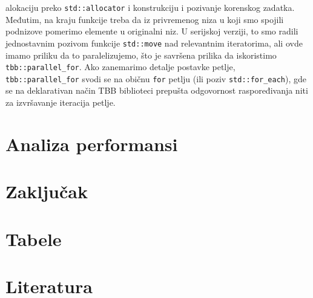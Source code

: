 \documentclass[a4paper,11pt]{article}
\begin{document}
    alokaciju preko \verb|std::allocator| i konstrukciju i pozivanje korenskog zadatka. Međutim,
    na kraju funkcije treba da iz privremenog niza u koji smo spojili podnizove pomerimo elemente u
    originalni niz. U serijskoj verziji, to smo radili jednostavnim pozivom funkcije \verb|std::move|
    nad relevantnim iteratorima, ali ovde imamo priliku da to paralelizujemo, što je savršena prilika
    da iskoristimo \verb|tbb::parallel_for|. Ako zanemarimo detalje postavke petlje, \verb|tbb::parallel_for|
    svodi se na običnu \verb|for| petlju (ili poziv \verb|std::for_each|), gde se na deklarativan način TBB biblioteci prepušta
    odgovornost raspoređivanja niti za izvršavanje iteracija petlje.
\newpage
    \section{Analiza performansi}
    \newpage

    \section{Zaključak}
    \newpage

    \section{Tabele}
    \newpage

    \section{Literatura}
    \newpage
\end{document}
